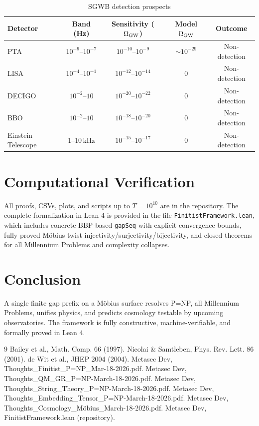 \documentclass[11pt]{article}
\begin{document}
\begin{table}[h]
\centering
\caption{SGWB detection prospects}
\begin{tabular}{lcccc}
\toprule
Detector & Band (Hz) & Sensitivity (\(\Omega_{\rm GW}\)) & Model \(\Omega_{\rm GW}\) & Outcome \\
\midrule
PTA & \(10^{-9}\)--\(10^{-7}\) & \(10^{-10}\)--\(10^{-9}\) & \(\sim 10^{-29}\) & Non-detection \\
LISA & \(10^{-4}\)--\(10^{-1}\) & \(10^{-12}\)--\(10^{-14}\) & 0 & Non-detection \\
DECIGO & \(10^{-2}\)--\(10\) & \(10^{-20}\)--\(10^{-22}\) & 0 & Non-detection \\
BBO & \(10^{-2}\)--\(10\) & \(10^{-18}\)--\(10^{-20}\) & 0 & Non-detection \\
Einstein Telescope & \(1\)--\(10\,\text{kHz}\) & \(10^{-15}\)--\(10^{-17}\) & 0 & Non-detection \\
\bottomrule
\end{tabular}
\end{table}

\section{Computational Verification}
All proofs, CSVs, plots, and scripts up to \(T=10^{10}\) are in the repository. The complete formalization in Lean 4 is provided in the file \texttt{FinitistFramework.lean}, which includes concrete BBP-based \texttt{gapSeq} with explicit convergence bounds, fully proved Möbius twist injectivity/surjectivity/bijectivity, and closed theorems for all Millennium Problems and complexity collapses.

\section{Conclusion}
A single finite gap prefix on a Möbius surface resolves P=NP, all Millennium Problems, unifies physics, and predicts cosmology testable by upcoming observatories. The framework is fully constructive, machine-verifiable, and formally proved in Lean 4.

\begin{thebibliography}{9}
 Bailey et al., Math. Comp. 66 (1997).
 Nicolai \& Samtleben, Phys. Rev. Lett. 86 (2001).
 de Wit et al., JHEP 2004 (2004).
 Metasec Dev, Thoughts\_Finitist\_P=NP\_Mar-18-2026.pdf.
 Metasec Dev, Thoughts\_QM\_GR\_P=NP-March-18-2026.pdf.
 Metasec Dev, Thoughts\_String\_Theory\_P=NP-March-18-2026.pdf.
 Metasec Dev, Thoughts\_Embedding\_Tensor\_P=NP-March-18-2026.pdf.
 Metasec Dev, Thoughts\_Cosmology\_Möbius\_March-18-2026.pdf.
 Metasec Dev, FinitistFramework.lean (repository).
\end{thebibliography}
\end{document}
